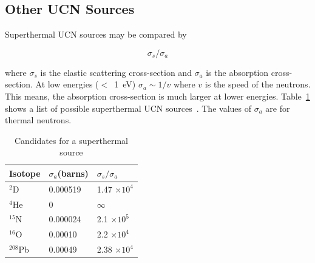 \subsection{Other UCN Sources~\cite{Salvat2013,Atchison2009,Liu_thesis}}

Superthermal UCN sources may be compared by

\begin{equation}
\sigma_s / \sigma_a
\end{equation}

where $\sigma_s$ is the elastic scattering cross-section and
$\sigma_a$ is the absorption cross-section. At low energies ($<$~1~eV)
$\sigma_a \sim 1/v$ where $v$ is the speed of the neutrons. This
means, the absorption cross-section is much larger at lower energies.
Table~\ref{tab:other_sources} shows a list of possible superthermal
UCN sources~\cite{Liu_thesis}. The values of $\sigma_a$ are for
thermal neutrons.


\begin{table}
\begin{center}
\begin{tabular}{|l|l|l|}
\hline
Isotope & $\sigma_a$(barns) & $\sigma_s / \sigma_a$  \\
\hline
$^2$D & 0.000519 & 1.47 $\times 10^4$ \\
\hline
$^4$He & 0 & $\infty$ \\
\hline
$^{15}$N & 0.000024 & 2.1 $\times 10^5$ \\
\hline
$^{16}$O & 0.00010 & 2.2 $\times 10^4$ \\
\hline
$^{208}$Pb & 0.00049 &  2.38 $\times 10^4$\\
\hline
\end{tabular}
\end{center}
\caption{Candidates for a superthermal source\label{tab:other_sources}}
\end{table}

